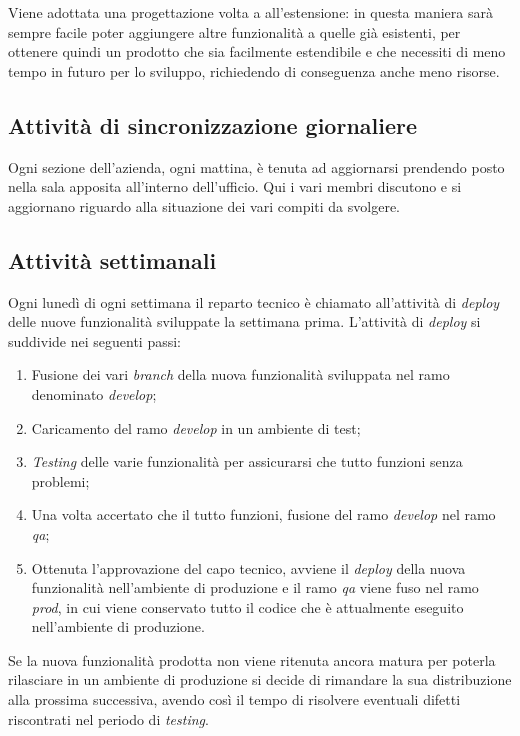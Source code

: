 Viene adottata una progettazione volta a all'estensione: in questa
maniera sarà sempre facile poter aggiungere altre funzionalità a quelle già
esistenti, per ottenere quindi un prodotto che sia facilmente estendibile e che
necessiti di meno tempo in futuro per lo sviluppo, richiedendo di conseguenza
anche meno risorse.

\subsection{Attività di sincronizzazione giornaliere}

Ogni sezione dell'azienda, ogni mattina, è tenuta ad aggiornarsi prendendo posto
nella sala apposita all'interno dell'ufficio. Qui i vari membri discutono e si
aggiornano riguardo alla situazione dei vari compiti da svolgere.

\subsection{Attività settimanali}
\label{intro:attivitaSettimanali}

Ogni lunedì di ogni settimana il reparto tecnico è chiamato all'attività di
\textit{deploy} delle nuove funzionalità sviluppate la settimana prima.
L'attività di \textit{deploy} si suddivide nei seguenti passi:
\begin{enumerate}

\item Fusione dei vari \textit{branch} della nuova funzionalità sviluppata nel
ramo denominato \textit{develop};
\item Caricamento del ramo \textit{develop} in un ambiente di test;
\item \textit{Testing} delle varie funzionalità per assicurarsi che tutto
funzioni senza problemi;
\item Una volta accertato che il tutto funzioni, fusione del ramo
\textit{develop} nel ramo \textit{qa};
\item Ottenuta l'approvazione del capo tecnico, avviene il \textit{deploy}
della nuova funzionalità nell'ambiente di produzione e il ramo \textit{qa}
viene fuso nel ramo \textit{prod}, in cui viene conservato tutto il codice che
è attualmente eseguito nell'ambiente di produzione.
\end{enumerate}

Se la nuova funzionalità prodotta non viene ritenuta ancora matura per poterla
rilasciare in un ambiente di produzione si decide di rimandare la sua
distribuzione alla prossima successiva, avendo così il tempo di risolvere
eventuali difetti riscontrati nel periodo di \textit{testing}.
